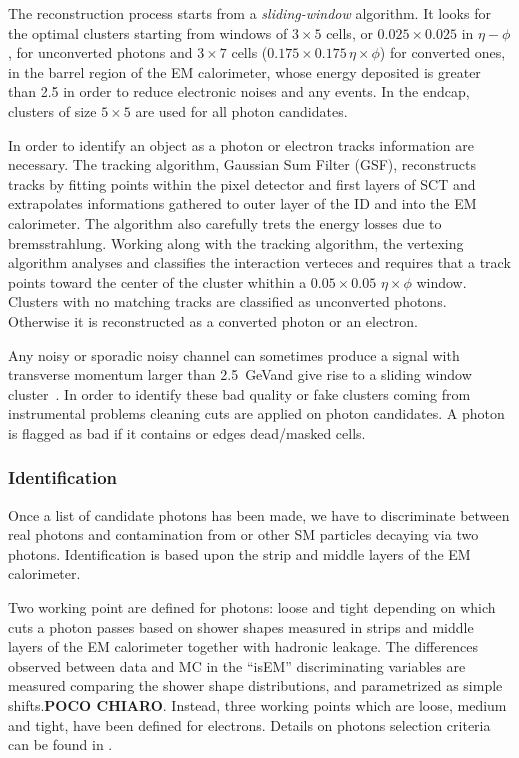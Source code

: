 The reconstruction process starts from a \emph{sliding-window} algorithm. It looks for the optimal clusters starting from windows of $3\times5$ cells, or $0.025\times0.025$ in $\eta-\phi$, for unconverted photons and $3\times7$ cells ($0.175\times0.175 \, \eta\times\phi$) for converted ones, in the barrel region of the EM calorimeter, whose energy deposited is greater than \SI{2.5}{\gev} in order to reduce electronic noises and any \pileup events. In the endcap, clusters of size $5\times5$ are used for all photon candidates.

In order to identify an object as a photon or electron tracks information are necessary. The tracking algorithm, Gaussian Sum Filter (GSF), reconstructs tracks by fitting points within the pixel detector and first layers of SCT and extrapolates informations gathered to outer layer of the ID and into the EM calorimeter. The algorithm also carefully trets the energy losses due to bremsstrahlung. Working along with the tracking algorithm, the vertexing algorithm analyses and classifies the interaction verteces and requires that a track points toward the center of the cluster whithin a $0.05\times0.05$ $\eta\times\phi$ window. Clusters with no matching tracks are classified as unconverted photons. Otherwise it is reconstructed as a converted photon or an electron.

Any noisy or sporadic noisy channel can sometimes produce a signal with transverse momentum larger than \SI{2.5}{\GeV }and give rise to a sliding window cluster~\cite{photons}. In order to identify these bad quality or fake clusters coming from instrumental problems cleaning cuts are applied on photon candidates. A photon is flagged as bad if it contains or edges dead/masked cells.

\subsubsection{Identification}
Once a list of candidate photons has been made, we have to discriminate between real photons and contamination from \pizero or other SM particles decaying via two photons. Identification is based upon the strip and middle layers of the EM calorimeter.

Two working point are defined for photons: loose and tight depending on which cuts a photon passes based on shower shapes measured in strips and middle layers of the EM calorimeter together with hadronic leakage. The differences observed between data and MC in the ``isEM'' discriminating variables are measured comparing the shower shape distributions, and parametrized as simple shifts.{\bfseries POCO CHIARO}. Instead, three working points which are loose, medium and tight, have been defined for electrons. Details on photons selection criteria can be found in \cite[Sect. 4]{photons}.

